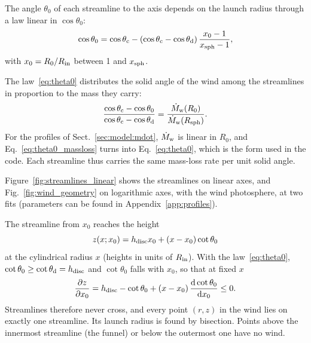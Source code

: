 The angle $\theta_0$ of each streamline to the axis depends on the launch radius through a law linear in $\cos\theta_0$:
\begin{equation}
\cos\theta_0 = \cos\theta_{\rm c} - (\cos\theta_{\rm c} - \cos\theta_{\rm d})\,\frac{x_0 - 1}{x_{\rm sph} - 1},
\label{eq:theta0}
\end{equation}
with $x_0 = R_0/R_{\rm in}$ between 1 and $x_{\rm sph}$.

The law~\eqref{eq:theta0} distributes the solid angle of the wind among the streamlines in proportion to the mass they carry:
\begin{equation}
\frac{\cos\theta_{\rm c} - \cos\theta_0}{\cos\theta_{\rm c} - \cos\theta_{\rm d}} = \frac{\dot M_{\rm w}(R_0)}{\dot M_{\rm w}(R_{\rm sph})} .
\label{eq:theta0_massloss}
\end{equation}
For the profiles of Sect.~\ref{sec:model:mdot}, $\dot M_{\rm w}$ is linear in $R_0$, and Eq.~\eqref{eq:theta0_massloss} turns into Eq.~\eqref{eq:theta0}, which is the form used in the code.
Each streamline thus carries the same mass-loss rate per unit solid angle.

Figure~\ref{fig:streamlines_linear} shows the streamlines on linear axes, and Fig.~\ref{fig:wind_geometry} on logarithmic axes, with the wind photosphere, at two fits (parameters can be found in Appendix~\ref{app:profiles}).

The streamline from $x_0$ reaches the height
\begin{equation}
z(x; x_0) = h_{\rm disc} x_0 + (x - x_0)\cot\theta_0
\label{eq:streamline}
\end{equation}
at the cylindrical radius $x$ (heights in units of $R_{\rm in}$).
With the law~\eqref{eq:theta0}, $\cot\theta_0 \ge \cot\theta_{\rm d} = h_{\rm disc}$ and $\cot\theta_0$ falls with $x_0$, so that at fixed $x$
\begin{equation}
\frac{\partial z}{\partial x_0} = h_{\rm disc} - \cot\theta_0 + (x - x_0)\,\frac{{\rm d}\cot\theta_0}{{\rm d}x_0} \le 0 .
\label{eq:dzdx0}
\end{equation}
Streamlines therefore never cross, and every point $(r, z)$ in the wind lies on exactly one streamline.
Its launch radius is found by bisection.
Points above the innermost streamline (the funnel) or below the outermost one have no wind.

